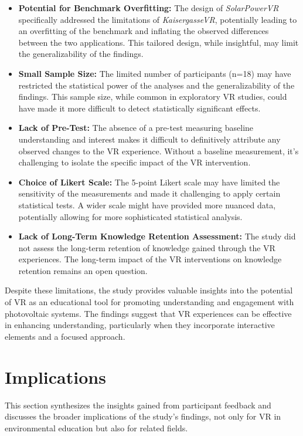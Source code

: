 \documentclass[draft, final]{vutinfth} %
\begin{document}
\begin{itemize}
    \item \textbf{Potential for Benchmark Overfitting:} The design of \textit{SolarPowerVR} specifically addressed the limitations of \textit{KaisergasseVR}, potentially leading to an overfitting of the benchmark and inflating the observed differences between the two applications.  This tailored design, while insightful, may limit the generalizability of the findings.
    \item \textbf{Small Sample Size:} The limited number of participants (n=18) may have restricted the statistical power of the analyses and the generalizability of the findings.  This sample size, while common in exploratory VR studies, could have made it more difficult to detect statistically significant effects. 
    \item \textbf{Lack of Pre-Test:} The absence of a pre-test measuring baseline understanding and interest makes it difficult to definitively attribute any observed changes to the VR experience.  Without a baseline measurement, it's challenging to isolate the specific impact of the VR intervention. 
    \item \textbf{Choice of Likert Scale:} The 5-point Likert scale may have limited the sensitivity of the measurements and made it challenging to apply certain statistical tests.  A wider scale might have provided more nuanced data, potentially allowing for more sophisticated statistical analysis. 
    \item \textbf{Lack of Long-Term Knowledge Retention Assessment:} The study did not assess the long-term retention of knowledge gained through the VR experiences.  The long-term impact of the VR interventions on knowledge retention remains an open question. 
\end{itemize}

Despite these limitations, the study provides valuable insights into the potential of VR as an educational tool for promoting understanding and engagement with photovoltaic systems. The findings suggest that VR experiences can be effective in enhancing understanding, particularly when they incorporate interactive elements and a focused approach.

\section{Implications}

This section synthesizes the insights gained from participant feedback and discusses the broader implications of the study's findings, not only for VR in environmental education but also for related fields.
\end{document}
